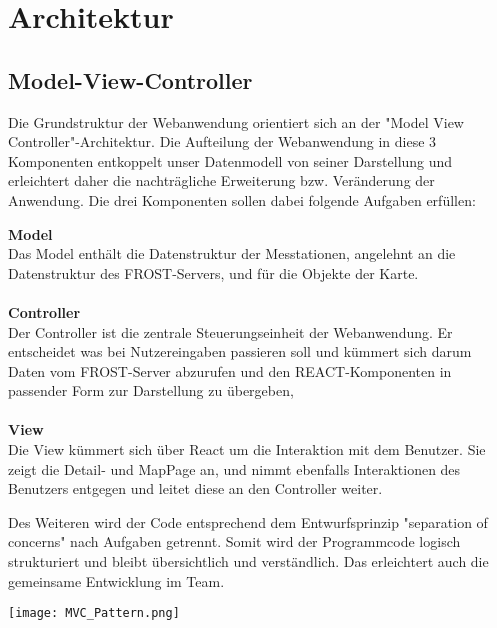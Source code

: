 \section{Architektur}

\subsection{Model-View-Controller}
Die Grundstruktur der Webanwendung orientiert sich an der "Model View Controller"-Architektur. Die Aufteilung der Webanwendung in diese 3 Komponenten entkoppelt unser Datenmodell von seiner Darstellung und erleichtert daher die nachträgliche Erweiterung bzw. Veränderung der Anwendung.
Die drei Komponenten sollen dabei folgende Aufgaben erfüllen:
\begin{addmargin}[25pt]{0pt}
    \textbf{Model}\\
    Das Model enthält die Datenstruktur der Messtationen, angelehnt an die Datenstruktur des \gls{FROST-Server}s, und für die Objekte der Karte.
    \\ \\
    \textbf{Controller}\\
    Der Controller ist die zentrale Steuerungseinheit der Webanwendung. Er entscheidet was bei Nutzereingaben passieren soll und kümmert sich darum Daten vom \gls{FROST-Server} abzurufen und den REACT-Komponenten in passender Form zur Darstellung zu übergeben,
    \\ \\
    \textbf{View}\\
    Die View kümmert sich über \gls{React} um die Interaktion mit dem Benutzer. Sie zeigt die Detail- und MapPage an, und nimmt ebenfalls Interaktionen des Benutzers entgegen und leitet diese an den Controller weiter.
\end{addmargin}

Des Weiteren wird der Code entsprechend dem Entwurfsprinzip "separation of concerns" nach Aufgaben getrennt. Somit wird der Programmcode logisch strukturiert und bleibt übersichtlich und verständlich. Das erleichtert auch die gemeinsame Entwicklung im Team.

\vspace{5mm}

\texttt{[image: MVC\_Pattern.png]}

\newpage

